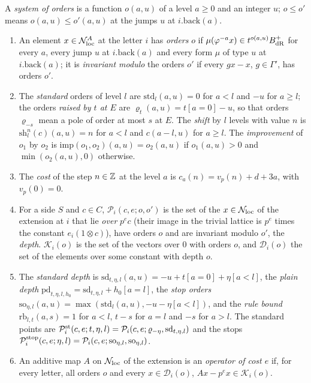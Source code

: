 \begin{definition}\label{def:chart-orders}
A \emph{system of orders} is a function $o(a,u)$ of a level $a\ge0$ and an integer $u$; $o\le o'$ means $o(a,u)\le o'(a,u)$ at the jumps $u$ at $i.\mathrm{back}(a)$.
\begin{enumerate}[label=\textup{(O\arabic*)}]
\item An element $x\in\mathcal N^A_{\rm loc}$ at the letter $i$ has \emph{orders} $o$ if $\mu(\varphi^{-a}x)\in t^{o(a,u)}B_{\rm dR}^+$ for every $a$, every jump $u$ at $i.\mathrm{back}(a)$ and every form $\mu$ of type $u$ at $i.\mathrm{back}(a)$; it is \emph{invariant modulo} the orders $o'$ if every
$gx-x$, $g\in\Gamma'$, has orders $o'$.
\item The \emph{standard} orders of level $l$ are $\mathrm{std}_l(a,u)=0$ for $a<l$ and $-u$ for $a\ge l$; the orders \emph{raised by $t$ at $E$} are $\varrho_t(a,u)=t[a=0]-u$, so that orders $\varrho_{-s}$ mean a pole of order at most $s$ at $E$. The \emph{shift} by $l$ levels with
value $n$ is $\mathrm{sh}^n_l(c)(a,u)=n$ for $a<l$ and $c(a-l,u)$ for $a\ge l$. The \emph{improvement} of $o_1$ by $o_2$ is $\mathrm{imp}(o_1,o_2)(a,u)=o_2(a,u)$ if $o_1(a,u)>0$ and $\min(o_2(a,u),0)$ otherwise.
\item The \emph{cost} of the step $n\in\mathbb{Z}$ at the level $a$ is $c_a(n)=v_p(n)+d+3a$, with $v_p(0)=0$.
\item For a side $S$ and $c\in C$, $\mathcal P_i(c,e;o,o')$ is the set of the $x\in\mathcal N_{\rm loc}$ of the extension at $i$ that lie \emph{over} $p^ec$ (their image in the trivial lattice is $p^e$ times the constant $e_i(1\otimes c)$), have orders $o$ and are invariant
modulo $o'$, the \emph{depth}. $\mathcal K_i(o)$ is the set of the vectors over $0$ with orders $o$, and $\mathcal D_i(o)$ the set of the elements over some constant with depth $o$.
\item The \emph{standard depth} is $\mathrm{sd}_{t,\eta,l}(a,u)=-u+t[a=0]+\eta[a<l]$, the \emph{plain depth} $\mathrm{pd}_{t,\eta,l,h_0}=\mathrm{sd}_{t,\eta,l}+h_0[a=l]$, the \emph{stop orders} $\mathrm{so}_{\eta,l}(a,u)=\max(\mathrm{std}_l(a,u),-u-\eta[a<l])$, and the \emph{rule bound}
$\mathrm{rb}_{l,t}(a,s)=1$ for $a<l$, $t-s$ for $a=l$ and $-s$ for $a>l$. The standard points are $\mathcal P^{\rm st}_i(c,e;t,\eta,l)=\mathcal P_i(c,e;\varrho_{-\eta},\mathrm{sd}_{t,\eta,l})$ and the stops $\mathcal P^{\rm stop}_i(c,e;\eta,l)=\mathcal P_i(c,e;\mathrm{so}_{\eta,l},\mathrm{so}_{\eta,l})$.
\item An additive map $A$ on $\mathcal N_{\rm loc}$ of the extension is an \emph{operator of cost $e$} if, for every letter, all orders $o$ and every $x\in\mathcal D_i(o)$, $Ax-p^ex\in\mathcal K_i(o)$.

\end{enumerate}
\end{definition}
